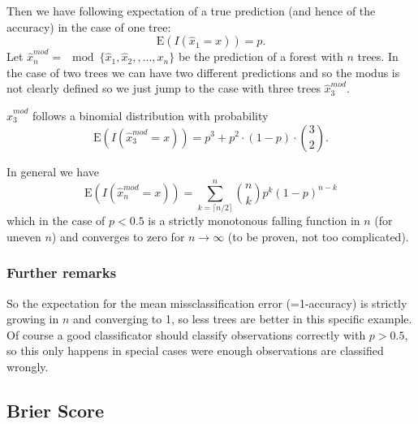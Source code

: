 \documentclass[paper=a4
               ,12pt
               ,DIV=12
               ,parskip=half
               ,titlepage=on
               ,headinclude 
               ,footinclude
               ,headsepline
               ,footsepline         %
               ,ilines 
               ]{scrartcl}
\begin{document}
Then we have following expectation of a true prediction (and hence of the accuracy) in the case of one tree: 
\begin{equation}
\text{E}(I(\hat{x}_1 = x)) = p. 
\end{equation}
Let $\hat{x}_n^{mod} = \mod \{\hat{x}_1, \hat{x}_2, , ... , x_n\}$ be the prediction of a forest with $n$ trees. 
In the case of two trees we can have two different predictions and so the modus is not clearly defined so we just jump to the case with three trees $\hat{x}_3^{mod}$. 

 $\hat{x}_3^{mod}$ follows a binomial distribution with probability 
 \begin{equation}
 \text{E}(I(\hat{x}_3^{mod} = x)) = p^3 +  p^2 \cdot (1-p) \cdot \binom{3}{2}.
\end{equation}

In general we have 
\begin{equation}
 \text{E}(I(\hat{x}_n^{mod} = x)) = \sum_{k= \lceil{n/2\rceil}}^n \binom{n}{k} p^k (1-p)^{n - k}
\end{equation}
which in the case of $p<0.5$ is a strictly monotonous falling function in $n$ (for uneven $n$) and converges to zero for $n \to \infty$ (to be proven, not too complicated). 

\subsubsection{Further remarks}
So the expectation for the mean missclassification error (=1-accuracy) is strictly growing in $n$ and converging to 1, so less trees are better in this specific example. 
Of course a good classificator should classify observations correctly with $p>0.5$, so this only happens in special cases were enough observations are classified wrongly. 

\clearpage 

\subsection{Brier Score}
\end{document}
